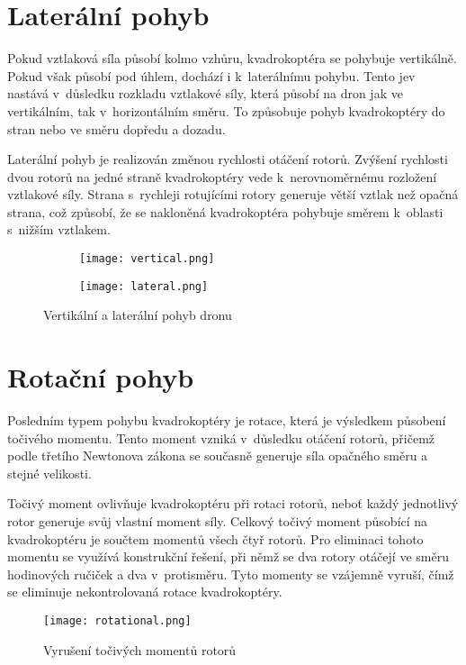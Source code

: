 \documentclass[12pt]{report}
\begin{document}
\section[Laterální pohyb]{Laterální pohyb}
Pokud vztlaková síla působí kolmo vzhůru, kvadrokoptéra se pohybuje vertikálně. Pokud však působí pod úhlem, dochází i k~laterálnímu pohybu. Tento jev nastává v~důsledku rozkladu vztlakové síly, která působí na dron jak ve vertikálním, tak v~horizontálním směru. To způsobuje pohyb kvadrokoptéry do stran nebo ve směru dopředu a dozadu.

Laterální pohyb je realizován změnou rychlosti otáčení rotorů. Zvýšení rychlosti dvou rotorů na jedné straně kvadrokoptéry vede k~nerovnoměrnému rozložení vztlakové síly. Strana s~rychleji rotujícími rotory generuje větší vztlak než opačná strana, což způsobí, že se nakloněná kvadrokoptéra pohybuje směrem k~oblasti s~nižším vztlakem.

\begin{figure}[H]
    \begin{subfigure}{0.45\linewidth}
        \centering
        \texttt{[image: vertical.png]}
    \end{subfigure}
    \hfill
    \begin{subfigure}{0.45\linewidth}
        \texttt{[image: lateral.png]}
    \end{subfigure}
    \caption{Vertikální a laterální pohyb dronu \cite{nasa}}
    \label{fig:batteries}
\end{figure}

\section[Rotační pohyb]{Rotační pohyb}
Posledním typem pohybu kvadrokoptéry je rotace, která je výsledkem působení točivého momentu. Tento moment vzniká v~důsledku otáčení rotorů, přičemž podle třetího Newtonova zákona se současně generuje síla opačného směru a stejné velikosti.

Točivý moment ovlivňuje kvadrokoptéru při rotaci rotorů, neboť každý jednotlivý rotor generuje svůj vlastní moment síly. Celkový točivý moment působící na kvadrokoptéru je součtem momentů všech čtyř rotorů. Pro eliminaci tohoto momentu se využívá konstrukční řešení, při němž se dva rotory otáčejí ve směru hodinových ručiček a dva v~protisměru. Tyto momenty se vzájemně vyruší, čímž se eliminuje nekontrolovaná rotace kvadrokoptéry.

\begin{figure}[H]
	\centering
	\texttt{[image: rotational.png]}
	\caption{Vyrušení točivých momentů rotorů \cite{nasa}}
	\label{fig:rotational.png}
\end{figure}
\end{document}
